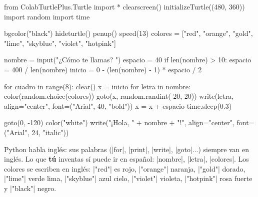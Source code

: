 \begin{typethis}
from ColabTurtlePlus.Turtle import *
clearscreen()
initializeTurtle((480, 360))
import random
import time

bgcolor("black")
hideturtle()
penup()
speed(13)
colores = ["red", "orange", "gold", "lime", "skyblue",
           "violet", "hotpink"]

nombre = input("¿Cómo te llamas? ")
espacio = 40
if len(nombre) > 10:
    espacio = 400 / len(nombre)
inicio = 0 - (len(nombre) - 1) * espacio / 2

for cuadro in range(8):
    clear()
    x = inicio
    for letra in nombre:
        color(random.choice(colores))
        goto(x, random.randint(-20, 20))
        write(letra, align="center",
              font=("Arial", 40, "bold"))
        x = x + espacio
    time.sleep(0.3)

goto(0, -120)
color("white")
write("¡Hola, " + nombre + "!", align="center",
      font=("Arial", 24, "italic"))
\end{typethis}

\begin{think}
Python habla inglés: sus palabras (\py|for|, \py|print|, \py|write|, \py|goto|...) siempre van en inglés. Lo que \textbf{tú} inventas sí puede ir en español: \py|nombre|, \py|letra|, \py|colores|. Los colores se escriben en inglés: \py|"red"| es rojo, \py|"orange"| naranja, \py|"gold"| dorado, \py|"lime"| verde lima, \py|"skyblue"| azul cielo, \py|"violet"| violeta, \py|"hotpink"| rosa fuerte y \py|"black"| negro.
\end{think}

